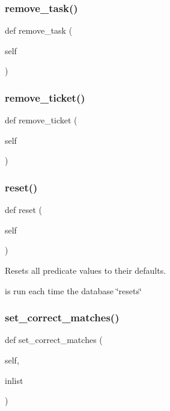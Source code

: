 \subsubsection{\texorpdfstring{remove\_task()}{remove\_task()}}
{\footnotesize\ttfamily def remove\+\_\+task (\begin{DoxyParamCaption}\item[{}]{self }\end{DoxyParamCaption})}

\mbox{\label{classdynamicfilterapp_1_1models_1_1_predicate_aa50b82ab39c996d4b89694655057ab8e}} 
\subsubsection{\texorpdfstring{remove\_ticket()}{remove\_ticket()}}
{\footnotesize\ttfamily def remove\+\_\+ticket (\begin{DoxyParamCaption}\item[{}]{self }\end{DoxyParamCaption})}

\mbox{\label{classdynamicfilterapp_1_1models_1_1_predicate_a51829b63adb24ac48d350dee60181002}} 
\subsubsection{\texorpdfstring{reset()}{reset()}}
{\footnotesize\ttfamily def reset (\begin{DoxyParamCaption}\item[{}]{self }\end{DoxyParamCaption})}



Resets all predicate values to their defaults. 

is run each time the database \char`\"{}resets\char`\"{} \mbox{\label{classdynamicfilterapp_1_1models_1_1_predicate_a1e690d6df7dc40428d200ce0494eb72a}} 
\subsubsection{\texorpdfstring{set\_correct\_matches()}{set\_correct\_matches()}}
{\footnotesize\ttfamily def set\+\_\+correct\+\_\+matches (\begin{DoxyParamCaption}\item[{}]{self,  }\item[{}]{inlist }\end{DoxyParamCaption})}


